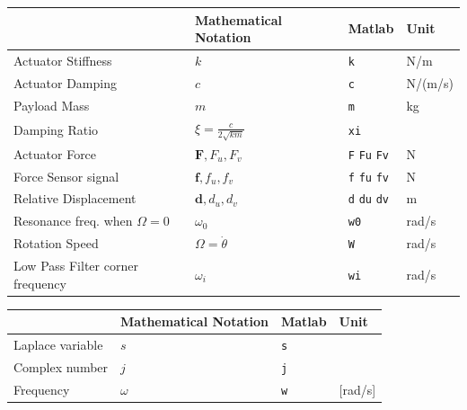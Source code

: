 \documentclass[a4paper, 10pt, DIV=12, parskip=full]{scrreprt}
\begin{document}
\begin{center}
\begin{tabular}{llll}
 & Mathematical Notation & Matlab & Unit\\
\hline
Actuator Stiffness & \(k\) & \texttt{k} & N/m\\
Actuator Damping & \(c\) & \texttt{c} & N/(m/s)\\
Payload Mass & \(m\) & \texttt{m} & kg\\
Damping Ratio & \(\xi = \frac{c}{2\sqrt{km}}\) & \texttt{xi} & \\
Actuator Force & \(\bm{F}, F_u, F_v\) & \texttt{F} \texttt{Fu} \texttt{Fv} & N\\
Force Sensor signal & \(\bm{f}, f_u, f_v\) & \texttt{f} \texttt{fu} \texttt{fv} & N\\
Relative Displacement & \(\bm{d}, d_u, d_v\) & \texttt{d} \texttt{du} \texttt{dv} & m\\
Resonance freq. when \(\Omega = 0\) & \(\omega_0\) & \texttt{w0} & rad/s\\
Rotation Speed & \(\Omega = \dot{\theta}\) & \texttt{W} & rad/s\\
Low Pass Filter corner frequency & \(\omega_i\) & \texttt{wi} & rad/s\\
\end{tabular}
\end{center}

\begin{center}
\begin{tabular}{llll}
 & Mathematical Notation & Matlab & Unit\\
\hline
Laplace variable & \(s\) & \texttt{s} & \\
Complex number & \(j\) & \texttt{j} & \\
Frequency & \(\omega\) & \texttt{w} & [rad/s]\\
\end{tabular}
\end{center}

\printbibliography


\end{document}
